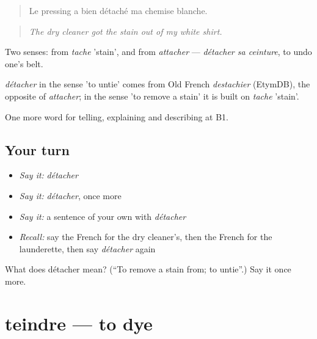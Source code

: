 \begin{quote}
Le pressing a bien détaché ma chemise blanche.
\end{quote}

\begin{quote}
\emph{The dry cleaner got the stain out of my white shirt.}
\end{quote}

Two senses: from \emph{tache} 'stain', and from \emph{attacher} — \emph{détacher sa ceinture}, to undo one's belt.

\begin{cousinweb}
\emph{détacher} in the sense 'to untie' comes from Old French \emph{destachier} (EtymDB), the opposite of \emph{attacher}; in the sense 'to remove a stain' it is built on \emph{tache} 'stain'.
\end{cousinweb}

\begin{grammarlens}[title={What you've built}]
One more word for telling, explaining and describing at B1.
\end{grammarlens}

\subsection*{Your turn}
\begin{itemize}
\raggedright
  \item \emph{Say it:} \emph{détacher}
  \item \emph{Say it:} \emph{détacher}, once more
  \item \emph{Say it:} a sentence of your own with \emph{détacher}
  \item \emph{Recall:} say the French for the dry cleaner’s, then the French for the launderette, then say \emph{détacher} again
\end{itemize}

\begin{tcolorbox}[breakable,colback=teal!4,colframe=teal!35!black,title={Before you move on}]
What does détacher mean? (\textquotedblleft{}To remove a stain from; to untie\textquotedblright{}.) Say it once more.
\end{tcolorbox}
\section[teindre]{teindre — to dye}

\label{lesson:FR-C447-teindre}



